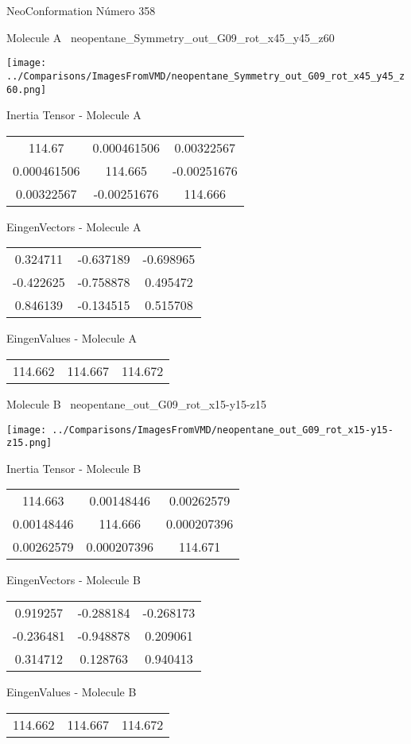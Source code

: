 \vtab[-3cm]
\begin{center}
{\large NeoConformation \tab Número 358}
\end{center}
\begin{multicols}{2}
\begin{center}

Molecule A \
neopentane\_Symmetry\_out\_G09\_rot\_x45\_y45\_z60

\texttt{[image: ../Comparisons/ImagesFromVMD/neopentane\_Symmetry\_out\_G09\_rot\_x45\_y45\_z60.png]}

Inertia Tensor - Molecule A \\
\begin{tabular}{|c c c|}
114.67	 & 	0.000461506	 & 	0.00322567	 \\
0.000461506	 & 	114.665	 & 	-0.00251676	 \\
0.00322567	 & 	-0.00251676	 & 	114.666
\end{tabular}

\vtab
 EingenVectors - Molecule A     \\
\begin{tabular}{|c c c|}
0.324711	 & 	-0.637189	 & 	-0.698965	 \\
-0.422625	 & 	-0.758878	 & 	0.495472	 \\
0.846139	 & 	-0.134515	 & 	0.515708
\end{tabular}

\vtab
 EingenValues - Molecule A     \\
\begin{tabular}{|c c c|}
114.662	 & 	114.667	 & 	114.672	 \\
\end{tabular}
\columnbreak

Molecule B \
neopentane\_out\_G09\_rot\_x15-y15-z15

\texttt{[image: ../Comparisons/ImagesFromVMD/neopentane\_out\_G09\_rot\_x15-y15-z15.png]}

Inertia Tensor - Molecule B \\
\begin{tabular}{|c c c|}
114.663	 & 	0.00148446	 & 	0.00262579	 \\
0.00148446	 & 	114.666	 & 	0.000207396	 \\
0.00262579	 & 	0.000207396	 & 	114.671
\end{tabular}

\vtab
 EingenVectors - Molecule B     \\
\begin{tabular}{|c c c|}
0.919257	 & 	-0.288184	 & 	-0.268173	 \\
-0.236481	 & 	-0.948878	 & 	0.209061	 \\
0.314712	 & 	0.128763	 & 	0.940413
\end{tabular}

\vtab
 EingenValues - Molecule B     \\
\begin{tabular}{|c c c|}
114.662	 & 	114.667	 & 	114.672	 \\
\end{tabular}

\end{center}
\end{multicols}

